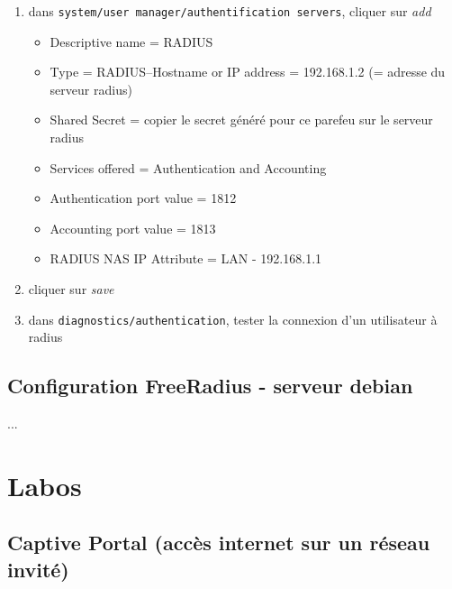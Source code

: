 \documentclass[a4paper]{article}
\begin{document}
\begin{enumerate}
    \item dans \texttt{system/user manager/authentification servers}, cliquer sur \textit{add}
    \begin{itemize}
        \item Descriptive name = RADIUS
        \item Type = RADIUS–Hostname or IP address = 192.168.1.2 (= adresse du serveur radius)
        \item Shared Secret = copier le secret généré pour ce parefeu sur le serveur radius
        \item Services offered = Authentication and Accounting
        \item Authentication port value = 1812
        \item Accounting port value = 1813
        \item RADIUS NAS IP Attribute = LAN - 192.168.1.1
    \end{itemize}
    \item cliquer sur \textit{save}
    \item dans \texttt{diagnostics/authentication}, tester la connexion d'un utilisateur à radius
\end{enumerate}










\subsection{Configuration FreeRadius - serveur debian}





...















\section{Labos}










\subsection{Captive Portal (accès internet sur un réseau invité)}
\end{document}
